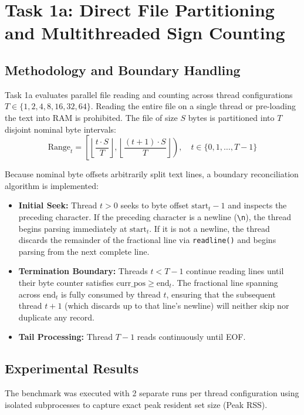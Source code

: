 \documentclass{labreport}
\begin{document}
\section{Task 1a: Direct File Partitioning and Multithreaded Sign Counting}

\subsection{Methodology and Boundary Handling}
Task 1a evaluates parallel file reading and counting across thread configurations $T \in \{1, 2, 4, 8, 16, 32, 64\}$. Reading the entire file on a single thread or pre-loading the text into RAM is prohibited. The file of size $S$ bytes is partitioned into $T$ disjoint nominal byte intervals:
\begin{equation}
\text{Range}_t = \left[ \left\lfloor \frac{t \cdot S}{T} \right\rfloor, \left\lfloor \frac{(t + 1) \cdot S}{T} \right\rfloor \right), \quad t \in \{0, 1, \dots, T - 1\}
\end{equation}

Because nominal byte offsets arbitrarily split text lines, a boundary reconciliation algorithm is implemented:
\begin{itemize}
    \item \textbf{Initial Seek:} Thread $t > 0$ seeks to byte offset $\text{start}_t - 1$ and inspects the preceding character. If the preceding character is a newline (\texttt{\textbackslash n}), the thread begins parsing immediately at $\text{start}_t$. If it is not a newline, the thread discards the remainder of the fractional line via \texttt{readline()} and begins parsing from the next complete line.
    \item \textbf{Termination Boundary:} Threads $t < T - 1$ continue reading lines until their byte counter satisfies $\text{curr\_pos} \ge \text{end}_t$. The fractional line spanning across $\text{end}_t$ is fully consumed by thread $t$, ensuring that the subsequent thread $t + 1$ (which discards up to that line's newline) will neither skip nor duplicate any record.
    \item \textbf{Tail Processing:} Thread $T - 1$ reads continuously until EOF.
\end{itemize}

\subsection{Experimental Results}
The benchmark was executed with 2 separate runs per thread configuration using isolated subprocesses to capture exact peak resident set size (Peak RSS).
\end{document}
